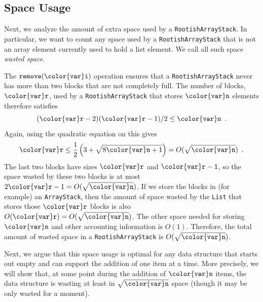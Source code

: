 \documentclass[10pt]{book}
\newcommand{\seclabel}[1]{\label{sec:#1}}
\theoremstyle{plain}
\theoremstyle{definition}
\begin{document}
\subsection{Space Usage}
\seclabel{rootishspaceusage}

Next, we analyze the amount of extra space used by a \texttt{RootishArrayStack}.
In particular, we want to count any space used by a \texttt{RootishArrayStack} that is not an array element currently used to hold a list element.  We call all such space \emph{wasted space}.
%

The \ensuremath{\mathtt{remove({\color{var}i})}} operation ensures that a \texttt{RootishArrayStack} never has
more than two blocks that are not completely full.  The number of blocks,
\ensuremath{\mathtt{{\color{var}r}}}, used by a \texttt{RootishArrayStack} that stores \ensuremath{\mathtt{{\color{var}n}}} elements therefore
satisfies
\[
    (\ensuremath{\mathtt{{\color{var}r}}}-2)(\ensuremath{\mathtt{{\color{var}r}}}-1)/2 \le \ensuremath{\mathtt{{\color{var}n}}} \enspace .
\]
Again, using the quadratic equation on this gives
\[
   \ensuremath{\mathtt{{\color{var}r}}} \le \frac{1}{2}\left(3+\sqrt{8\ensuremath{\mathtt{{\color{var}n}}}+1}\right) = O(\sqrt{\ensuremath{\mathtt{{\color{var}n}}}}) \enspace .
\]
The last two blocks have sizes \ensuremath{\mathtt{{\color{var}r}}} and \ensuremath{\mathtt{{\color{var}r}-1}}, so the space wasted by these
two blocks is at most $2\ensuremath{\mathtt{{\color{var}r}}}-1 = O(\sqrt{\ensuremath{\mathtt{{\color{var}n}}}})$.  If we store the blocks
in (for example) an \texttt{ArrayStack}, then the amount of space wasted by the
\texttt{List} that stores those \ensuremath{\mathtt{{\color{var}r}}} blocks is also $O(\ensuremath{\mathtt{{\color{var}r}}})=O(\sqrt{\ensuremath{\mathtt{{\color{var}n}}}})$.  The
other space needed for storing \ensuremath{\mathtt{{\color{var}n}}} and other accounting information is $O(1)$.
Therefore, the total amount of wasted space in a \texttt{RootishArrayStack}
is $O(\sqrt{\ensuremath{\mathtt{{\color{var}n}}}})$.

Next, we argue that this space usage is optimal for any data structure
that starts out empty and can support the addition of one item at
a time. More precisely, we will show that, at some point during the
addition of \ensuremath{\mathtt{{\color{var}n}}} items, the data structure is wasting at least in $\sqrt{\ensuremath{\mathtt{{\color{var}n}}}}$ space (though it may be only wasted for a moment).
\end{document}
